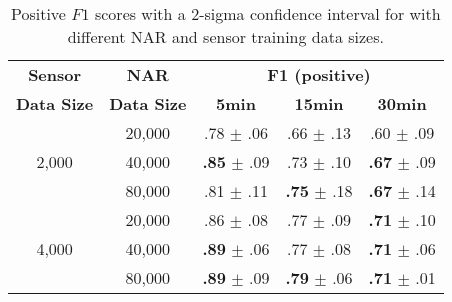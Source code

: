 
\begin{table}[t]
    \centering
    \small
    \setlength{\tabcolsep}{3pt}
    \caption{Positive $F1$ scores with a 2-sigma confidence interval for \narce{} with different NAR and sensor training data sizes.}
    \vskip 0.15in
    \begin{tabular}{c c c c c} %
        \toprule
        \textbf{Sensor} & \textbf{NAR} & \multicolumn{3}{c}{\textbf{F1 (positive)}}\\
        \cmidrule(lr){3-5}
        \textbf{Data Size} & \textbf{Data Size} & \textbf{5min} & \textbf{15min} & \textbf{30min} \\
        \midrule
        \multirow{3}{*}{2,000} & 20,000 & .78 $\pm$ .06 & .66 $\pm$ .13 & .60 $\pm$ .09 \\
                               & 40,000 & \textbf{.85} $\pm$ .09 & .73 $\pm$ .10 & \textbf{.67} $\pm$ .09 \\
                               & 80,000 & .81 $\pm$ .11 & \textbf{.75} $\pm$ .18 & \textbf{.67} $\pm$ .14 \\
        \midrule
        \multirow{3}{*}{4,000} & 20,000 & .86 $\pm$ .08 & .77 $\pm$ .09 & \textbf{.71} $\pm$ .10 \\
                               & 40,000 & \textbf{.89} $\pm$ .06 & .77 $\pm$ .08 & \textbf{.71} $\pm$ .06 \\
                               & 80,000 & \textbf{.89} $\pm$ .09 & \textbf{.79} $\pm$ .06 & \textbf{.71}  $\pm$ .01\\
        \bottomrule
    \end{tabular}
    \label{tab:narce_trainsize}
    \vskip -0.1in
\end{table}


